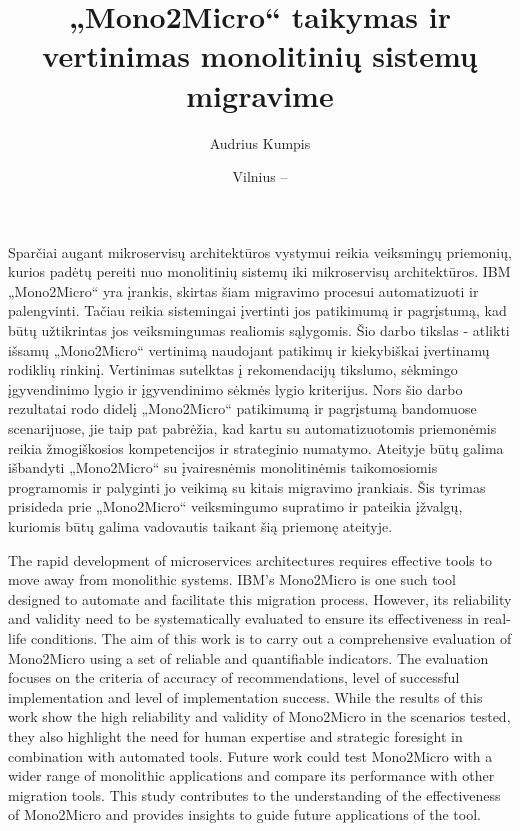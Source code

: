 \documentclass{VUMIFPSbakalaurinis}
\institute{Informatikos institutas}  %
\title{„Mono2Micro“ taikymas ir vertinimas monolitinių sistemų migravime}
\author{Audrius Kumpis}
\date{Vilnius – \the\year}
\begin{document}
\maketitle

Sparčiai augant mikroservisų architektūros vystymui reikia veiksmingų priemonių, kurios padėtų pereiti nuo monolitinių sistemų iki mikroservisų architektūros. IBM „Mono2Micro“ yra įrankis, skirtas šiam migravimo procesui automatizuoti ir palengvinti. Tačiau reikia sistemingai įvertinti jos patikimumą ir pagrįstumą, kad būtų užtikrintas jos veiksmingumas realiomis sąlygomis. Šio darbo tikslas - atlikti išsamų „Mono2Micro“ vertinimą naudojant patikimų ir kiekybiškai įvertinamų rodiklių rinkinį. Vertinimas sutelktas į rekomendacijų tikslumo, sėkmingo įgyvendinimo lygio ir įgyvendinimo sėkmės lygio kriterijus. Nors šio darbo rezultatai rodo didelį „Mono2Micro“ patikimumą ir pagrįstumą bandomuose scenarijuose, jie taip pat pabrėžia, kad kartu su automatizuotomis priemonėmis reikia žmogiškosios kompetencijos ir strateginio numatymo. Ateityje būtų galima išbandyti „Mono2Micro“ su įvairesnėmis monolitinėmis taikomosiomis programomis ir palyginti jo veikimą su kitais migravimo įrankiais. Šis tyrimas prisideda prie „Mono2Micro“ veiksmingumo supratimo ir pateikia įžvalgų, kuriomis būtų galima vadovautis taikant šią priemonę ateityje.

The rapid development of microservices architectures requires effective tools to move away from monolithic systems. IBM's Mono2Micro is one such tool designed to automate and facilitate this migration process. However, its reliability and validity need to be systematically evaluated to ensure its effectiveness in real-life conditions. The aim of this work is to carry out a comprehensive evaluation of Mono2Micro using a set of reliable and quantifiable indicators. The evaluation focuses on the criteria of accuracy of recommendations, level of successful implementation and level of implementation success. While the results of this work show the high reliability and validity of Mono2Micro in the scenarios tested, they also highlight the need for human expertise and strategic foresight in combination with automated tools. Future work could test Mono2Micro with a wider range of monolithic applications and compare its performance with other migration tools. This study contributes to the understanding of the effectiveness of Mono2Micro and provides insights to guide future applications of the tool.
\end{document}
